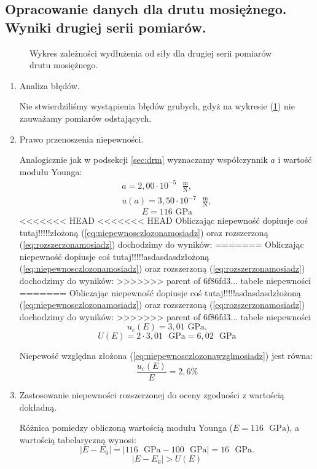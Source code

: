\documentclass [a4paper,11pt]{article}
\begin{document}
	\subsection{Opracowanie danych dla drutu mosiężnego. Wyniki drugiej serii pomiarów.}
	
	\begin{figure}[!h]
		\centering

		\caption{Wykres zależności wydłużenia od siły dla drugiej serii pomiarów drutu mosiężnego.}
		\label{fig:wykmosiadz2}
	\end{figure}
	
	\begin{enumerate}[label=\alph*)]
		\item Analiza błędów.
		
		Nie stwierdziliśmy wystąpienia błędów grubych, gdyż na wykresie (\ref{fig:wykmosiadz2}) nie zauważamy pomiarów odstających.
		
		\item Prawo przenoszenia niepewności.
		
		Analogicznie jak w podsekcji \ref{sec:drm} wyznaczamy współczynnik $a$ i wartość modułu Younga:
		\begin{align}
		a = 2,00 \cdot 10^{-5} \text{ }\mathrm{\frac{m}{N}},\label{a} \\
		u(a) = 3,50 \cdot 10^{-7} \text{ }\mathrm{\frac{m}{N}},
		\end{align}
		$$ E = 116 \text{ GPa} $$
<<<<<<< HEAD
<<<<<<< HEAD
		Obliczając niepewność dopiusje coś tutaj!!!!!złożoną (\ref{eq:niepewnosczlozonamosiadz}) oraz rozszerzoną (\ref{eq:rozszerzonamosiadz}) dochodzimy do wyników: 
=======
		Obliczając niepewność dopiusje coś tutaj!!!!!asdasdasdzłożoną (\ref{eq:niepewnosczlozonamosiadz}) oraz rozszerzoną (\ref{eq:rozszerzonamosiadz}) dochodzimy do wyników: 
>>>>>>> parent of 6f86fd3... tabele niepewności
=======
		Obliczając niepewność dopiusje coś tutaj!!!!!asdasdasdzłożoną (\ref{eq:niepewnosczlozonamosiadz}) oraz rozszerzoną (\ref{eq:rozszerzonamosiadz}) dochodzimy do wyników: 
>>>>>>> parent of 6f86fd3... tabele niepewności
		$$ u_c(E) = 3,01 \text{ GPa,} $$
		$$ U(E) = 2 \cdot 3,01 \text{ }\mathrm{GPa} = 6,02 \text{ }\mathrm{GPa} $$
		
		Niepewość względna złożona (\ref{eq:niepewnosczlozonawzglmosiadz}) jest równa:
		$$ \frac{u_c(E)}{E} = 2,6\% $$
		
		\item Zastosowanie niepewności rozszerzonej do oceny zgodności z wartością dokładną.
		
		Różnica pomiedzy obliczoną wartością modułu Younga ($E=116  \text{ }\mathrm{GPa}$), a wartością tabelaryczną wynosi:
		\begin{equation}
		\label{eq:roznicamosiadz2}
		|E - E_0| = \left|116 \text{ }\mathrm{GPa} - 100 \text{ }\mathrm{GPa}\right| = 16 \text{ }\mathrm{GPa}.
		\end{equation}
		$$
		|E - E_0| > U(E)
		$$
		
		
	\end{enumerate}
\end{document}
